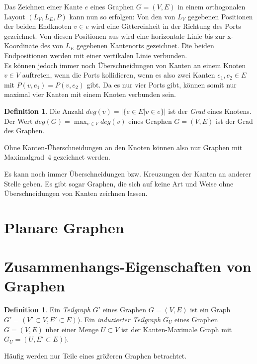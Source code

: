 \documentclass[a4paper]{scrreprt}
\theoremstyle{definition}
\newtheorem{definition}[satz]{Definition}
\begin{document}
Das Zeichnen einer Kante $e$ eines Graphen $G = (V,E)$ in einem orthogonalen Layout $(L_V,L_E,P)$ kann nun so erfolgen: Von den von $L_V$ gegebenen Positionen der beiden Endknoten $v \in e$ wird eine Gittereinheit in der Richtung des Ports gezeichnet. Von diesen Positionen aus wird eine horizontale Linie bis zur x-Koordinate des von $L_E$ gegebenen Kantenorts gezeichnet. Die beiden Endpositionen werden mit einer vertikalen Linie verbunden. %
\\

Es können jedoch immer noch Überschneidungen von Kanten an einem Knoten $v \in V$ auftreten, wenn die Ports kollidieren, wenn es also zwei Kanten $e_1, e_2 \in E$ mit $P(v, e_1) = P(v, e_2)$ gibt. Da es nur vier Ports gibt, können somit nur maximal vier Kanten mit einem Knoten verbunden sein.

\begin{definition}
  Die Anzahl $deg(v) = |\{e \in E | v \in e\}|$ ist der \emph{Grad} eines Knotens. Der Wert $deg(G) = \max_{v \in V}{deg(v)}$ eines Graphen $G = (V, E)$ ist der Grad des Graphen.
\end{definition}

Ohne Kanten-Überschneidungen an den Knoten können also nur Graphen mit Maximalgrad~4 gezeichnet werden. 

Es kann noch immer Überschneidungen bzw. Kreuzungen der Kanten an anderer Stelle geben. Es gibt sogar Graphen, die sich auf keine Art und Weise ohne Überschneidungen von Kanten zeichnen lassen.

\section{Planare Graphen}


\section{Zusammenhangs-Eigenschaften von Graphen}

\begin{definition}
  Ein \emph{Teilgraph} $G'$ eines Graphen $G=(V, E)$ ist ein Graph $G' = (V' \subset V, E' \subset E))$.
  Ein \emph{induzierter Teilgraph} $G_U$ eines Graphen $G=(V, E)$ über einer Menge $U \subset V$ ist der Kanten-Maximale Graph mit $G_U = (U , E' \subset E))$.
\end{definition}

Häufig werden nur Teile eines größeren Graphen betrachtet. %
\end{document}
